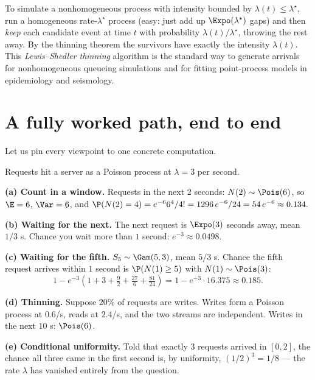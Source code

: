 \begin{applicationbox}
To simulate a nonhomogeneous process with intensity bounded by
$\lambda(t)\le \lambda^\star$, run a homogeneous rate-$\lambda^\star$ process
(easy: just add up $\Expo(\lambda^\star)$ gaps) and then \emph{keep} each
candidate event at time $t$ with probability $\lambda(t)/\lambda^\star$, throwing
the rest away. By the thinning theorem the survivors have exactly the intensity
$\lambda(t)$. This \emph{Lewis--Shedler thinning} algorithm is the standard way
to generate arrivals for nonhomogeneous queueing simulations and for fitting
point-process models in epidemiology and seismology.
\end{applicationbox}

\section{A fully worked path, end to end}
\label{ch25:worked-path}

Let us pin every viewpoint to one concrete computation.

\begin{example}
\label{ch25:ex-server}
Requests hit a server as a Poisson process at $\lambda = 3$ per second.

\textbf{(a) Count in a window.} Requests in the next 2 seconds:
$N(2) \sim \Pois(6)$, so $\E = 6$, $\Var = 6$, and
$\P(N(2)=4) = e^{-6}6^4/4! = 1296\,e^{-6}/24 = 54\,e^{-6} \approx 0.134.$

\textbf{(b) Waiting for the next.} The next request is $\Expo(3)$ seconds away,
mean $1/3$ s. Chance you wait more than $1$ second: $e^{-3}\approx 0.0498$.

\textbf{(c) Waiting for the fifth.} $S_5\sim\Gam(5,3)$, mean $5/3$ s. Chance the
fifth request arrives within $1$ second is $\P(N(1)\ge 5)$ with
$N(1)\sim\Pois(3)$:
\[
1 - e^{-3}\!\left(1+3+\tfrac{9}{2}+\tfrac{27}{6}+\tfrac{81}{24}\right)
= 1 - e^{-3}\cdot 16.375 \approx 0.185.
\]

\textbf{(d) Thinning.} Suppose $20\%$ of requests are writes. Writes form a
Poisson process at $0.6$/s, reads at $2.4$/s, and the two streams are
independent. Writes in the next $10$ s: $\Pois(6)$.

\textbf{(e) Conditional uniformity.} Told that exactly $3$ requests arrived in
$[0,2]$, the chance all three came in the first second is, by uniformity,
$(1/2)^3 = 1/8$ --- the rate $\lambda$ has vanished entirely from the question.
\end{example}

